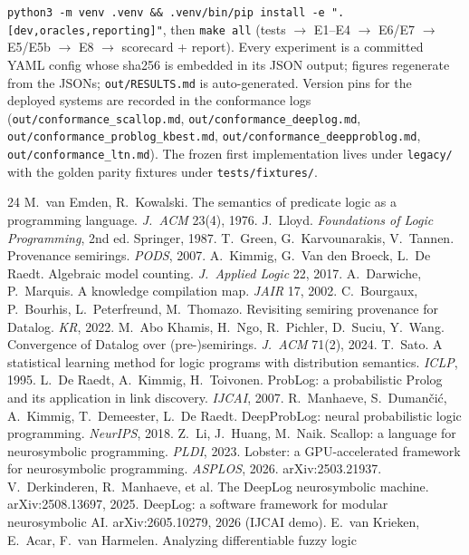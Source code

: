 \documentclass[10pt]{article}
\theoremstyle{remark}
\begin{document}
\texttt{python3 -m venv .venv \&\& .venv/bin/pip install -e ".[dev,oracles,reporting]"}, then
\texttt{make all} (tests $\to$ E1--E4 $\to$ E6/E7 $\to$ E5/E5b $\to$ E8 $\to$ scorecard + report).
Every experiment is a committed YAML config whose sha256 is embedded in its JSON output; figures
regenerate from the JSONs; \texttt{out/RESULTS.md} is auto-generated. Version pins for the
deployed systems are recorded in the conformance logs (\texttt{out/conformance\_scallop.md},
\texttt{out/conformance\_deeplog.md}, \texttt{out/conformance\_problog\_kbest.md}, \texttt{out/conformance\_deepproblog.md}, \texttt{out/conformance\_ltn.md}). The frozen first
implementation lives under \texttt{legacy/} with the golden parity fixtures under
\texttt{tests/fixtures/}.

\begin{thebibliography}{24}\small
{} M.~van Emden, R.~Kowalski. The semantics of predicate logic as a programming
language. \emph{J.\ ACM} 23(4), 1976.
 J.~Lloyd. \emph{Foundations of Logic Programming}, 2nd ed. Springer, 1987.
 T.~Green, G.~Karvounarakis, V.~Tannen. Provenance semirings. \emph{PODS}, 2007.
 A.~Kimmig, G.~Van den Broeck, L.~De Raedt. Algebraic model counting.
\emph{J.\ Applied Logic} 22, 2017.
 A.~Darwiche, P.~Marquis. A knowledge compilation map. \emph{JAIR} 17, 2002.
 C.~Bourgaux, P.~Bourhis, L.~Peterfreund, M.~Thomazo. Revisiting semiring
provenance for Datalog. \emph{KR}, 2022.
 M.~Abo Khamis, H.~Ngo, R.~Pichler, D.~Suciu, Y.~Wang. Convergence of Datalog
over (pre-)semirings. \emph{J.\ ACM} 71(2), 2024.
 T.~Sato. A statistical learning method for logic programs with distribution
semantics. \emph{ICLP}, 1995.
 L.~De Raedt, A.~Kimmig, H.~Toivonen. ProbLog: a probabilistic Prolog and its
application in link discovery. \emph{IJCAI}, 2007.
 R.~Manhaeve, S.~Duman\v{c}i\'c, A.~Kimmig, T.~Demeester, L.~De Raedt.
DeepProbLog: neural probabilistic logic programming. \emph{NeurIPS}, 2018.
 Z.~Li, J.~Huang, M.~Naik. Scallop: a language for neurosymbolic programming.
\emph{PLDI}, 2023.
 Lobster: a GPU-accelerated framework for neurosymbolic programming.
\emph{ASPLOS}, 2026. arXiv:2503.21937.
 V.~Derkinderen, R.~Manhaeve, et al. The DeepLog neurosymbolic machine.
arXiv:2508.13697, 2025.
 DeepLog: a software framework for modular neurosymbolic AI. arXiv:2605.10279,
2026 (IJCAI demo).
 E.~van Krieken, E.~Acar, F.~van Harmelen. Analyzing differentiable fuzzy logic

\end{thebibliography}
\end{document}
